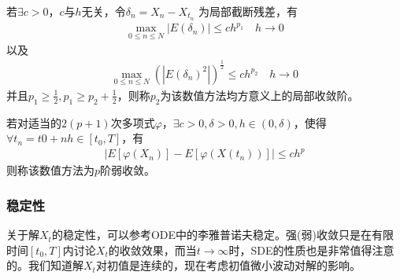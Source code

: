             \begin{definition}[局部收敛阶]
                若$\exists c>0$，$c$与$h$无关，令$\delta_n = X_n - X_{t_n}$
                为局部截断残差，有
                \begin{align*}
                \max_{0 \leqslant n \leqslant N}|E(\delta_n)| \leqslant ch^{p_1} \quad h\rightarrow 0
                \end{align*}
                以及
                \begin{align*}
                \max_{0 \leqslant n \leqslant N}\left(|E(\delta_n)^2| \right)^\frac{1}{2}\leqslant ch^{p_2} \quad h\rightarrow 0
                \end{align*}
                并且$p_1 \geqslant \frac 12,p_1 \geqslant p_2 + \frac 12$，则称$p_2$为该数值方法均方意义上的局部收敛阶。
            \end{definition}
            \begin{definition}[弱收敛]
                若对适当的$2(p+1)$次多项式$\varphi$，$\exists c>0,\delta >0,h\in (0,\delta)$，使得$\forall t_n = t0+nh\in [t_0,T]$，有
                \begin{align*}
                \Big|E[\varphi (X_n)] - E[\varphi(X(t_n))]\Big| \leqslant ch^p
                \end{align*}
                则称该数值方法为$p$阶弱收敛。
            \end{definition}
        \subsubsection{稳定性}
            \label{subsubsec:稳定性}
            \par
            关于解$X_t$的稳定性，可以参考ODE中的李雅普诺夫稳定。强(弱)收敛只是在有限时间$[t_0,T]$内讨论$X_t$的收敛效果，而当$t\rightarrow\infty$时，SDE的性质也是非常值得注意的。我们知道解$X_t$对初值是连续的，现在考虑初值微小波动对解的影响。
